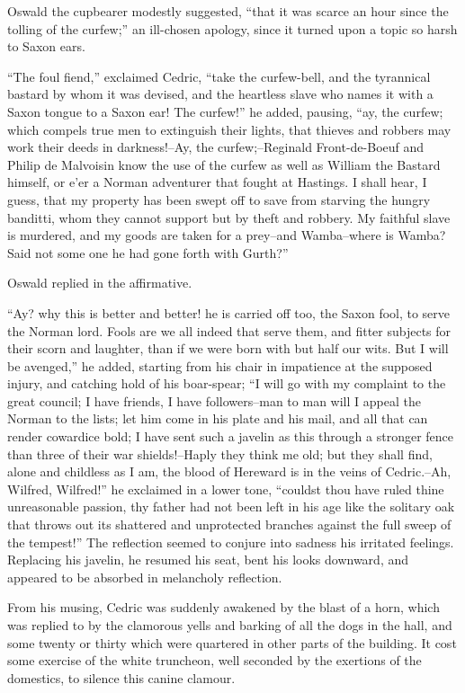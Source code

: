 Oswald the cupbearer modestly suggested, ``that it was scarce an hour
since the tolling of the curfew;'' an ill-chosen apology, since it
turned upon a topic so harsh to Saxon ears.

``The foul fiend,'' exclaimed Cedric, ``take the curfew-bell, and the
tyrannical bastard by whom it was devised, and the heartless slave who
names it with a Saxon tongue to a Saxon ear! The curfew!'' he added,
pausing, ``ay, the curfew; which compels true men to extinguish their
lights, that thieves and robbers may work their deeds in darkness!--Ay,
the curfew;--Reginald Front-de-Boeuf and Philip de Malvoisin know the
use of the curfew as well as William the Bastard himself, or e'er a
Norman adventurer that fought at Hastings. I shall hear, I guess, that
my property has been swept off to save from starving the hungry
banditti, whom they cannot support but by theft and robbery. My faithful
slave is murdered, and my goods are taken for a prey--and Wamba--where
is Wamba? Said not some one he had gone forth with Gurth?''

Oswald replied in the affirmative.

``Ay? why this is better and better! he is carried off too, the Saxon
fool, to serve the Norman lord. Fools are we all indeed that serve them,
and fitter subjects for their scorn and laughter, than if we were born
with but half our wits. But I will be avenged,'' he added, starting from
his chair in impatience at the supposed injury, and catching hold of his
boar-spear; ``I will go with my complaint to the great council; I have
friends, I have followers--man to man will I appeal the Norman to the
lists; let him come in his plate and his mail, and all that can render
cowardice bold; I have sent such a javelin as this through a stronger
fence than three of their war shields!--Haply they think me old; but
they shall find, alone and childless as I am, the blood of Hereward is
in the veins of Cedric.--Ah, Wilfred, Wilfred!'' he exclaimed in a lower
tone, ``couldst thou have ruled thine unreasonable passion, thy father
had not been left in his age like the solitary oak that throws out its
shattered and unprotected branches against the full sweep of the
tempest!'' The reflection seemed to conjure into sadness his irritated
feelings. Replacing his javelin, he resumed his seat, bent his looks
downward, and appeared to be absorbed in melancholy reflection.

From his musing, Cedric was suddenly awakened by the blast of a horn,
which was replied to by the clamorous yells and barking of all the dogs
in the hall, and some twenty or thirty which were quartered in other
parts of the building. It cost some exercise of the white truncheon,
well seconded by the exertions of the domestics, to silence this canine
clamour.

